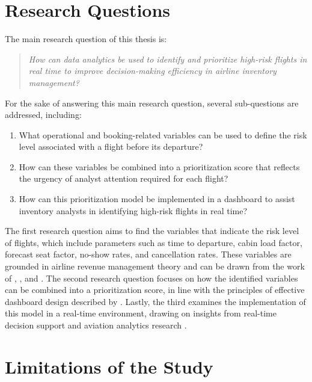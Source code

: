 \section{Research Questions}
\label{sec:rq}

The main research question of this thesis is:

\begin{quote}
\textit{How can data analytics be used to identify and prioritize high-risk flights in real time to improve decision-making efficiency in airline inventory management?}
\end{quote}

For the sake of answering this main research question, several sub-questions are addressed, including:

\begin{enumerate}
    \item What operational and booking-related variables can be used to define the risk level associated with a flight before its departure?
    \item How can these variables be combined into a prioritization score that reflects the urgency of analyst attention required for each flight?
    \item How can this prioritization model be implemented in a dashboard to assist inventory analysts in identifying high-risk flights in real time?
\end{enumerate}

The first research question aims to find the variables that indicate the risk level of flights, which include parameters such as time to departure, cabin load factor, forecast seat factor, no-show rates, and cancellation rates. These variables are grounded in airline revenue management theory and can be drawn from the work of \citet{Belobaba1987,Belobaba1989}, \citet{PakPiersma2002}, and \citet{SomboonAmaruchkul2016}. The second research question focuses on how the identified variables can be combined into a prioritization score, in line with the principles of effective dashboard design described by \citet{YigitbasiogluVelcu2012}. Lastly, the third examines the implementation of this model in a real-time environment, drawing on insights from real-time decision support and aviation analytics research \citep{Rakshit1996, Salleh2023, Watson2006}.

\section{Limitations of the Study}
\label{sec:limitations}

